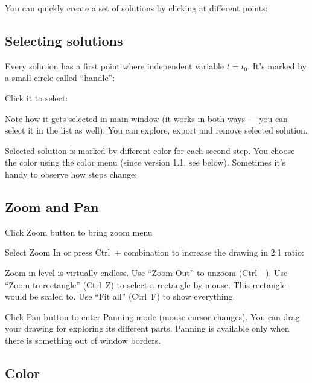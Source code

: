 \documentclass[12pt]{article}
\begin{document}
You can quickly create a set of solutions by clicking at different points:




\subsection{Selecting solutions}

Every solution has a first point where independent variable \(t=t_0\).
It's marked by a small circle called ``handle'':


Click it to select:


Note how it gets selected in main window (it works in both ways --- you can select it in the list as well).
You can explore, export and remove selected solution.

Selected solution is marked by different color for each second step.
You choose the color using the color menu (since version 1.1, see below).
Sometimes it's handy to observe how steps change:







\subsection{Zoom and Pan}

Click Zoom button  to bring zoom menu


Select Zoom In or press Ctrl~+ combination to increase the drawing in 2:1 ratio:


Zoom in level is virtually endless.
Use ``Zoom Out'' to unzoom (Ctrl~--). Use ``Zoom to rectangle'' (Ctrl~Z) to select a rectangle by mouse.
This rectangle would be scaled to. Use ``Fit all'' (Ctrl~F) to show everything.

Click Pan button  to enter Panning mode (mouse cursor changes).
You can drag your drawing for exploring its different parts. Panning is available only 
when there is something out of window borders.


\subsection{Color}
\end{document}
